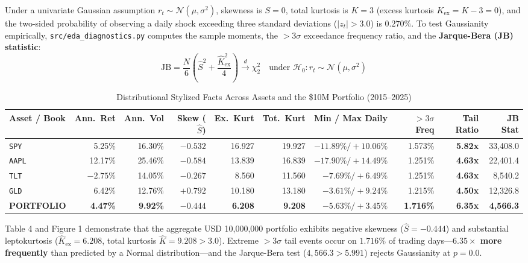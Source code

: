 \documentclass[11pt,a4paper]{article}
\begin{document}
Under a univariate Gaussian assumption $r_t \sim \mathcal{N}(\mu, \sigma^2)$, skewness is $S = 0$, total kurtosis is $K = 3$ (excess kurtosis $K_{\text{ex}} = K - 3 = 0$), and the two-sided probability of observing a daily shock exceeding three standard deviations ($|z_t| > 3.0$) is $0.270\%$. To test Gaussianity empirically, \texttt{src/eda\_diagnostics.py} computes the sample moments, the $>3\sigma$ exceedance frequency ratio, and the \textbf{Jarque-Bera (JB) statistic}:
\begin{equation}
\text{JB} = \frac{N}{6}\left(\hat{S}^2 + \frac{\hat{K}_{\text{ex}}^2}{4}\right) \xrightarrow{d} \chi^2_2 \quad \text{under } \mathcal{H}_0: r_t \sim \mathcal{N}(\mu, \sigma^2)
\end{equation}

\begin{table}[H]
\centering
\caption{Distributional Stylized Facts Across Assets and the \$10M Portfolio (2015--2025)}
\footnotesize
\begin{tabular}{lrrrrrrrrr}
\toprule
\textbf{Asset / Book} & \textbf{Ann.\ Ret} & \textbf{Ann.\ Vol} & \textbf{Skew ($\hat{S}$)} & \textbf{Ex.\ Kurt} & \textbf{Tot.\ Kurt} & \textbf{Min / Max Daily} & \textbf{$>3\sigma$ Freq} & \textbf{Tail Ratio} & \textbf{JB Stat} \\
\midrule
\texttt{SPY} & 5.25\% & 16.30\% & $-0.532$ & 16.927 & 19.927 & $-11.89\% / +10.06\%$ & 1.573\% & \textbf{5.82x} & 33,408.0 \\
\texttt{AAPL} & 12.17\% & 25.46\% & $-0.584$ & 13.839 & 16.839 & $-17.90\% / +14.49\%$ & 1.251\% & \textbf{4.63x} & 22,401.4 \\
\texttt{TLT} & $-2.75\%$ & 14.05\% & $-0.267$ & 8.560 & 11.560 & $-7.69\% / +6.49\%$ & 1.251\% & \textbf{4.63x} & 8,540.2 \\
\texttt{GLD} & 6.42\% & 12.76\% & $+0.792$ & 10.180 & 13.180 & $-3.61\% / +9.24\%$ & 1.215\% & \textbf{4.50x} & 12,326.8 \\
\midrule
\textbf{PORTFOLIO} & \textbf{4.47\%} & \textbf{9.92\%} & \textbf{$-0.444$} & \textbf{6.208} & \textbf{9.208} & \textbf{$-5.63\% / +3.45\%$} & \textbf{1.716\%} & \textbf{6.35x} & \textbf{4,566.3} \\
\bottomrule
\end{tabular}
\end{table}

Table 4 and Figure 1 demonstrate that the aggregate USD 10,000,000 portfolio exhibits negative skewness ($\hat{S} = -0.444$) and substantial leptokurtosis ($\hat{K}_{\text{ex}} = 6.208$, total kurtosis $\hat{K} = 9.208 > 3.0$). Extreme $>3\sigma$ tail events occur on $1.716\%$ of trading days---\textbf{$6.35\times$ more frequently} than predicted by a Normal distribution---and the Jarque-Bera test ($4,566.3 > 5.991$) rejects Gaussianity at $p = 0.0$.
\end{document}
